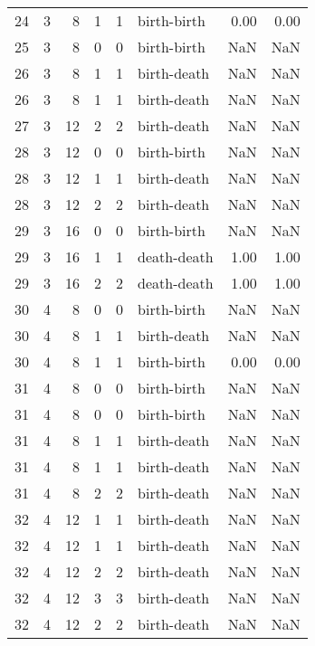 \documentclass{article}
\begin{document}
\begin{center}
\begin{tabular}{rrrrrlrr}
24 & 3 & 8 & 1 & 1 & birth-birth & 0.00 & 0.00 \\
25 & 3 & 8 & 0 & 0 & birth-birth & NaN & NaN \\
26 & 3 & 8 & 1 & 1 & birth-death & NaN & NaN \\
26 & 3 & 8 & 1 & 1 & birth-death & NaN & NaN \\
27 & 3 & 12 & 2 & 2 & birth-death & NaN & NaN \\
28 & 3 & 12 & 0 & 0 & birth-birth & NaN & NaN \\
28 & 3 & 12 & 1 & 1 & birth-death & NaN & NaN \\
28 & 3 & 12 & 2 & 2 & birth-death & NaN & NaN \\
29 & 3 & 16 & 0 & 0 & birth-birth & NaN & NaN \\
29 & 3 & 16 & 1 & 1 & death-death & 1.00 & 1.00 \\
29 & 3 & 16 & 2 & 2 & death-death & 1.00 & 1.00 \\
30 & 4 & 8 & 0 & 0 & birth-birth & NaN & NaN \\
30 & 4 & 8 & 1 & 1 & birth-death & NaN & NaN \\
30 & 4 & 8 & 1 & 1 & birth-birth & 0.00 & 0.00 \\
31 & 4 & 8 & 0 & 0 & birth-birth & NaN & NaN \\
31 & 4 & 8 & 0 & 0 & birth-birth & NaN & NaN \\
31 & 4 & 8 & 1 & 1 & birth-death & NaN & NaN \\
31 & 4 & 8 & 1 & 1 & birth-death & NaN & NaN \\
31 & 4 & 8 & 2 & 2 & birth-death & NaN & NaN \\
32 & 4 & 12 & 1 & 1 & birth-death & NaN & NaN \\
32 & 4 & 12 & 1 & 1 & birth-death & NaN & NaN \\
32 & 4 & 12 & 2 & 2 & birth-death & NaN & NaN \\
32 & 4 & 12 & 3 & 3 & birth-death & NaN & NaN \\
32 & 4 & 12 & 2 & 2 & birth-death & NaN & NaN \\
\bottomrule
\end{tabular}
\end{center}
\end{document}
